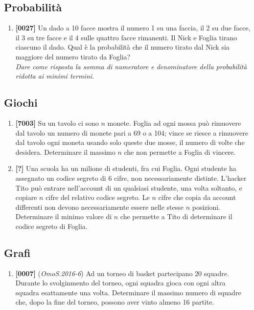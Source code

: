 \documentclass[10pt]{article}
\begin{document}
\subsection{Probabilità}
\begin{enumerate}
	\item \textbf{[0027]} Un dado a 10 facce mostra il numero 1 su una faccia, il 2 su due facce, il 3 su tre facce e il 4 sulle quattro facce rimanenti. Il Nick e Foglia tirano ciascuno il dado. Qual è la probabilità che il numero tirato dal Nick sia maggiore del numero tirato da Foglia?\\
		\textit{Dare come risposta la somma di numeratore e denominatore della probabilità ridotta ai minimi termini.}

\end{enumerate}

\subsection{Giochi}
\begin{enumerate}
	\item \textbf{[7003]} Su un tavolo ci sono $n$ monete. Foglia ad ogni mossa può rimuovere dal tavolo un numero di monete pari a 69 o a 104; vince se riesce a rimuovere dal tavolo ogni moneta usando solo queste due mosse, il numero di volte che desidera. Determinare il massimo $n$ che non permette a Foglia di vincere.

	\item \textbf{[?]} Una scuola ha un milione di studenti, fra cui Foglia. Ogni studente ha assegnato un codice segreto di 6 cifre, non necessariamente distinte. L'hacker Tito può entrare nell'account di un qualsiasi studente, una volta soltanto, e copiare $n$ cifre del relativo codice segreto. Le $n$ cifre che copia da account differenti non devono necessariamente essere nelle stesse $n$ posizioni. Determinare il minimo valore di $n$ che permette a Tito di determinare il codice segreto di Foglia.
\end{enumerate}

\subsection{Grafi}
\begin{enumerate}
	\item \textbf{[0007]} (\textit{OmoS.2016-6}) Ad un torneo di basket partecipano 20 squadre. Durante lo svolginmento del torneo, ogni squadra gioca con ogni altra squadra esattamente una volta. Determinare il massimo numero di squadre che, dopo la fine del torneo, possono aver vinto almeno 16 partite.
\end{enumerate}
\end{document}
